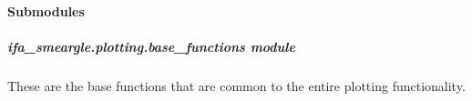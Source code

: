 \documentclass[letterpaper,10pt,english]{sphinxmanual}
\begin{document}
\paragraph{Submodules}
\label{\detokenize{docstrings/ifa_smeargle.plotting:submodules}}

\subparagraph{ifa\_smeargle.plotting.base\_functions module}
\label{\detokenize{docstrings/ifa_smeargle.plotting.base_functions:module-ifa_smeargle.plotting.base_functions}}\label{\detokenize{docstrings/ifa_smeargle.plotting.base_functions:ifa-smeargle-plotting-base-functions-module}}\label{\detokenize{docstrings/ifa_smeargle.plotting.base_functions::doc}}
These are the base functions that are common to the entire plotting
functionality.
\end{document}
